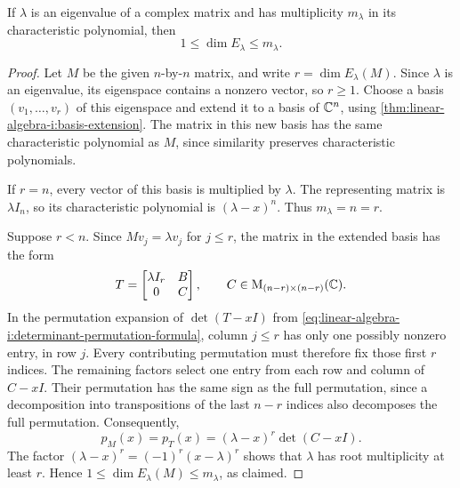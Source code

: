 \begin{proposition}
  \label{thm:linear-algebra-i:eigenspace-multiplicity}
  If \(\lambda\) is an eigenvalue of a complex matrix and has
  multiplicity \(m_\lambda\) in its characteristic polynomial, then
  \[
    1\le\dim E_\lambda\le m_\lambda.
  \]
\end{proposition}
\begin{pendingreview}
\begin{proof}
  Let \(M\) be the given \(n\)-by-\(n\) matrix, and write
  \(r=\dim E_\lambda(M)\). Since \(\lambda\) is an eigenvalue,
  its eigenspace contains a nonzero vector, so \(r\ge1\).
  Choose a basis \((v_1,\ldots,v_r)\) of this eigenspace and extend it
  to a basis of \(\mathbb{C}^n\), using
  \autoref{thm:linear-algebra-i:basis-extension}.
  The matrix in this new basis has the same characteristic polynomial
  as \(M\), since similarity preserves characteristic polynomials.

  If \(r=n\), every vector of this basis is multiplied by \(\lambda\).
  The representing matrix is \(\lambda I_n\), so its characteristic
  polynomial is \((\lambda-x)^n\). Thus \(m_\lambda=n=r\).

  Suppose \(r<n\). Since \(Mv_j=\lambda v_j\) for \(j\le r\),
  the matrix in the extended basis has the form
  \[
    T=\begin{bmatrix}\lambda I_r&B\\0&C\end{bmatrix},
    \qquad C\in\mathrm M_{(n-r)\times(n-r)}(\mathbb{C}).
  \]
  In the permutation expansion of \(\det(T-xI)\) from
  \autoref{eq:linear-algebra-i:determinant-permutation-formula},
  column \(j\le r\) has only one
  possibly nonzero entry, in row \(j\). Every contributing permutation
  must therefore fix those first \(r\) indices. The remaining factors
  select one entry from each row and column of \(C-xI\). Their
  permutation has the same sign as the full permutation, since a
  decomposition into transpositions of the last \(n-r\) indices also
  decomposes the full permutation. Consequently,
  \[
    p_M(x)=p_T(x)=(\lambda-x)^r\det(C-xI).
  \]
  The factor \((\lambda-x)^r=(-1)^r(x-\lambda)^r\) shows that
  \(\lambda\) has root multiplicity at least \(r\). Hence
  \(1\le\dim E_\lambda(M)\le m_\lambda\), as claimed.
\end{proof}
\end{pendingreview}


